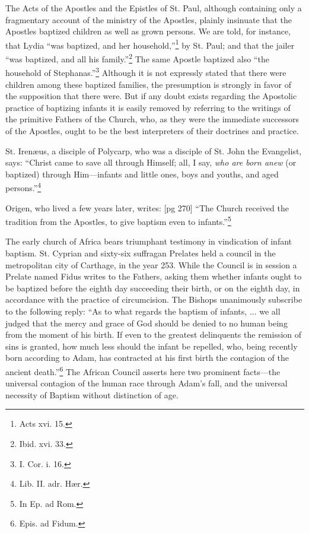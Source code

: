 The Acts of the Apostles and the Epistles of
St. Paul, although containing only a fragmentary
account of the ministry of the Apostles, plainly
insinuate that the Apostles baptized children as
well as grown persons. We are told, for instance,
that Lydia “was baptized, and her
household,”\footnote{Acts xvi. 15.}
by St. Paul; and that the jailer “was baptized, and
all his family.”\footnote{Ibid. xvi.
33.} The same Apostle baptized also
“the household of Stephanas.”\footnote{I.
Cor. i. 16.} Although it is
not expressly stated that there were children
among these baptized families, the presumption
is strongly in favor of the supposition that there
were. But if any doubt exists regarding the
Apostolic practice of baptizing infants it is easily
removed by referring to the writings of the primitive
Fathers of the Church, who, as they were
the immediate successors of the Apostles, ought
to be the best interpreters of their doctrines and
practice.

St. Irenæus, a disciple of Polycarp, who was a
disciple of St. John the Evangelist, says: “Christ
came to save all through Himself; all, I say, \emph{who
are born anew} (or baptized) through Him—infants
and little ones, boys and youths, and aged
persons.”\footnote{Lib. II. adr. Hær.}

Origen, who lived a few years later, writes:
[pg 270]
“The Church received the tradition from the
Apostles, to give baptism even to infants.”\footnote{In Ep. ad Rom.}

The early church of Africa bears triumphant
testimony in vindication of infant baptism. St.
Cyprian and sixty-six suffragan Prelates held a
council in the metropolitan city of Carthage, in the
year 253. While the Council is in session a Prelate
named Fidus writes to the Fathers, asking
them whether infants ought to be baptized before
the eighth day succeeding their birth, or on the
eighth day, in accordance with the practice of
circumcision. The Bishops unanimously subscribe
to the following reply: “As to what regards
the baptism of infants, ... we all judged
that the mercy and grace of God should be denied
to no human being from the moment of his
birth. If even to the greatest delinquents the remission
of sins is granted, how much less should
the infant be repelled, who, being recently born
according to Adam, has contracted at his first
birth the contagion of the ancient death.”\footnote{Epis.
ad Fidum.} The
African Council asserts here two prominent facts—the
universal contagion of the human race
through Adam's fall, and the universal necessity
of Baptism without distinction of age.

